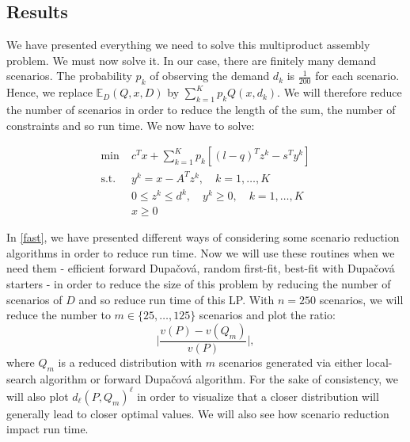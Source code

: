 \documentclass{amsart}
\begin{document}
\subsection{Results}
We have presented everything we need to solve this multiproduct assembly problem. We must now solve it. In our case, there are finitely many demand scenarios. The probability $p_k$ of observing the demand $d_k$ is $\frac{1}{200}$ for each scenario. Hence, we replace $\mathbb{E}_D\left(Q,x,D\right)$ by $\sum_{k=1}^Kp_kQ\left(x,d_k\right)$. We will therefore reduce the number of scenarios in order to reduce the length of the sum, the number of constraints and so run time. We now have to solve:

\begin{equation}\label{LP}
\begin{aligned}
    \min\; &c^Tx + \sum_{k=1}^{K} p_k \left[ (l - q)^T z^k - s^T y^k \right] \\
    \text{s.t. } & y^k = x - A^T z^k, \quad k = 1, \ldots, K \\
    & 0 \leq z^k \leq d^k, \quad y^k \geq 0, \quad k = 1, \ldots, K \\
    & x \geq 0
\end{aligned}
\end{equation}

In \ref{fast}, we have presented different ways of considering some scenario reduction algorithms in order to reduce run time. Now we will use these routines when we need them - efficient forward Dupačová, random first-fit, best-fit with Dupačová starters -  in order to reduce the size of this problem by reducing the number of scenarios of $D$ and so reduce run time of this LP. With $n=250$ scenarios, we will reduce the number to $m\in\{25,\hdots,125\}$ scenarios and plot the ratio: $$\lvert\frac{ v(P)-v(Q_m)}{v(P)}\rvert,$$ where $Q_m$ is a reduced distribution with $m$ scenarios generated via either local-search algorithm or forward Dupačová algorithm. For the sake of consistency, we will also plot $d_\ell\left(P,Q_m\right)^\ell$ in order to visualize that a closer distribution will generally lead to closer optimal values. We will also see how scenario reduction impact run time.
\end{document}
